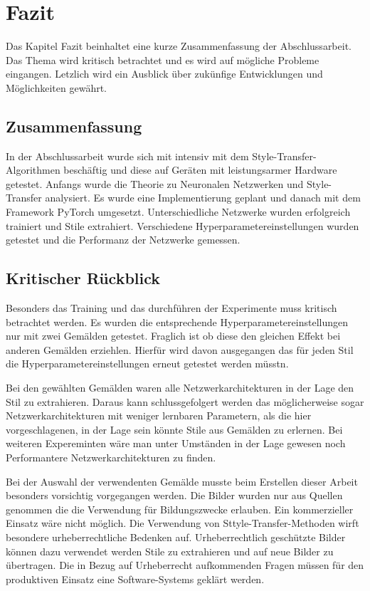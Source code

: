 \chapter{Fazit}

Das Kapitel Fazit beinhaltet eine kurze Zusammenfassung der Abschlussarbeit. Das Thema wird kritisch betrachtet und es wird auf mögliche Probleme eingangen.
Letzlich wird ein Ausblick über zukünfige Entwicklungen und Möglichkeiten gewährt.

\section{Zusammenfassung}

In der Abschlussarbeit wurde sich mit intensiv mit dem Style-Transfer-Algorithmen beschäftig und diese auf Geräten mit leistungsarmer Hardware getestet.
Anfangs wurde die Theorie zu Neuronalen Netzwerken und Style-Transfer analysiert. Es wurde eine Implementierung geplant und danach mit dem Framework PyTorch umgesetzt. Unterschiedliche Netzwerke wurden erfolgreich trainiert und Stile extrahiert. Verschiedene Hyperparametereinstellungen wurden getestet und die Performanz der Netzwerke gemessen.


\section{Kritischer Rückblick}

Besonders das Training und das durchführen der Experimente muss kritisch betrachtet werden. Es wurden die entsprechende Hyperparametereinstellungen nur mit zwei Gemälden getestet. Fraglich ist ob diese den gleichen Effekt bei anderen Gemälden erziehlen. Hierfür wird davon ausgegangen das für jeden Stil die Hyperparametereinstellungen erneut getestet werden müsstn.

Bei den gewählten Gemälden waren alle Netzwerkarchitekturen in der Lage den Stil zu extrahieren. Daraus kann schlussgefolgert werden das möglicherweise sogar Netzwerkarchitekturen mit weniger lernbaren Parametern, als die hier vorgeschlagenen, in der Lage sein könnte Stile aus Gemälden zu erlernen. Bei weiteren Expereminten wäre man unter Umständen in der Lage gewesen noch Performantere Netzwerkarchitekturen zu finden.

Bei der Auswahl der verwendenten Gemälde musste beim Erstellen dieser Arbeit besonders vorsichtig vorgegangen werden. Die Bilder wurden nur aus Quellen genommen die die Verwendung für Bildungszwecke erlauben. Ein kommerzieller Einsatz wäre nicht möglich. Die Verwendung von Sttyle-Transfer-Methoden wirft besondere urheberrechtliche Bedenken auf. Urheberrechtlich geschützte Bilder können dazu verwendet werden Stile zu extrahieren und auf neue Bilder zu übertragen. Die in Bezug auf Urheberrecht aufkommenden Fragen müssen für den produktiven Einsatz eine Software-Systems geklärt werden.

